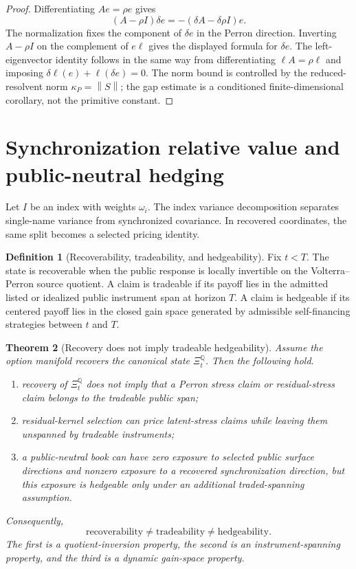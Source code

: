 \documentclass[11pt,a4paper]{amsart}
\theoremstyle{plain}
\newtheorem{theorem}{Theorem}[section]
\theoremstyle{definition}
\newtheorem{definition}[theorem]{Definition}
\theoremstyle{remark}
\newcommand{\QQ}{\mathbb{Q}}
\newcommand{\norm}[1]{\left\lVert #1\right\rVert}
\begin{document}
\begin{proof}
Differentiating \(Ae=\rho e\) gives
\[
        (A-\rho I)\delta e=-(\delta A-\delta\rho I)e .
\]
The normalization fixes the component of \(\delta e\) in the Perron direction.  Inverting
\(A-\rho I\) on the complement of \(e\ell\) gives the displayed formula for \(\delta e\).  The
left-eigenvector identity follows in the same way from differentiating \(\ell A=\rho\ell\) and
imposing \(\delta\ell(e)+\ell(\delta e)=0\).  The norm bound is controlled by the reduced-resolvent
norm \(\kappa_P=\norm{S}\); the gap estimate is a conditioned finite-dimensional corollary, not the
primitive constant.
\end{proof}

\section{Synchronization relative value and public-neutral hedging}\label{sec:rv}

Let \(I\) be an index with weights \(\omega_i\).  The index variance decomposition separates
single-name variance from synchronized covariance.  In recovered coordinates, the same split
becomes a selected pricing identity.

\begin{definition}[Recoverability, tradeability, and hedgeability]\label{def:recoverability-tradeability-hedgeability}
Fix \(t<T\).  The state is recoverable when the public response is locally invertible on the
Volterra--Perron source quotient.  A claim is tradeable if its payoff lies in the admitted
listed or idealized public instrument span at horizon \(T\).  A claim is hedgeable if its centered
payoff lies in the closed gain space generated by admissible self-financing strategies between
\(t\) and \(T\).
\end{definition}

\begin{theorem}[Recovery does not imply tradeable hedgeability]\label{thm:recovery-not-trading}
Assume the option manifold recovers the canonical state \(\Xi_t^\QQ\).  Then the following
hold.
\begin{enumerate}[leftmargin=2em]
\item recovery of \(\Xi_t^\QQ\) does not imply that a Perron stress claim or residual-stress claim
belongs to the tradeable public span;
\item residual-kernel selection can price latent-stress claims while leaving them unspanned by
tradeable instruments;
\item a public-neutral book can have zero exposure to selected public surface directions and
nonzero exposure to a recovered synchronization direction, but this exposure is hedgeable only
under an additional traded-spanning assumption.
\end{enumerate}
Consequently,
\[
        \text{recoverability}
        \ne
        \text{tradeability}
        \ne
        \text{hedgeability}.
\]
The first is a quotient-inversion property, the second is an instrument-spanning property, and the
third is a dynamic gain-space property.
\end{theorem}
\end{document}
